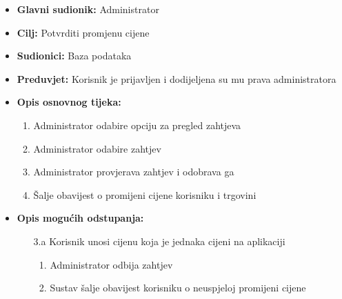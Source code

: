                         \noindent {}
					\begin{itemize}
	
						\item \textbf{Glavni sudionik: }Administrator
						\item  \textbf{Cilj:} Potvrditi promjenu cijene 
						\item  \textbf{Sudionici:} Baza podataka
						\item  \textbf{Preduvjet:} Korisnik je prijavljen i dodijeljena su mu prava administratora
						\item  \textbf{Opis osnovnog tijeka:}
						
						\item[] \begin{enumerate}
							\item Administrator odabire opciju za pregled zahtjeva
                                \item Administrator odabire zahtjev
                                \item Administrator provjerava zahtjev i odobrava ga
                                \item Šalje obavijest o promijeni cijene korisniku i trgovini
						\end{enumerate}

                            \item  \textbf{Opis mogućih odstupanja:}
						
						\item[] \begin{enumerate}
	
							\item[3.a] Korisnik unosi cijenu koja je jednaka cijeni na aplikaciji
							\item[] \begin{enumerate}
								\item Administrator odbija zahtjev
								\item Sustav šalje obavijest korisniku o neuspjeloj promijeni cijene\\
								
							\end{enumerate}
			
							
						\end{enumerate}
						
					\end{itemize}

